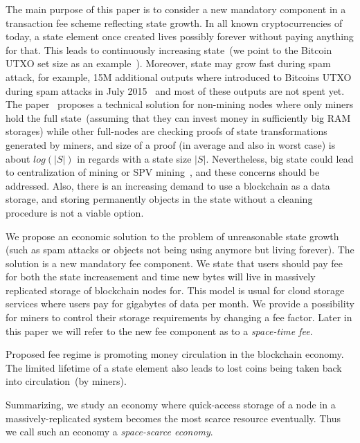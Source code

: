 \documentclass[]{llncs}   %
\begin{document}
The main purpose of this paper is to consider a new mandatory component in a transaction fee scheme reflecting state growth. In all known cryptocurrencies of today, a state element once created lives possibly forever without paying anything for that. This leads to continuously increasing state~(we point to the Bitcoin UTXO set size as an example~\cite{utxoChart}). Moreover, state may grow fast during spam attack, for example, 15M additional outputs where introduced to Bitcoins UTXO during spam attacks in July 2015~\cite{bitcoin2015flood} and most of these outputs are not spent yet. The paper~\cite{reyzin2016improving} proposes a technical solution for non-mining nodes where only miners hold the full state~(assuming that they can invest money in sufficiently big RAM storages) while other full-nodes are checking proofs of state transformations generated by miners, and size of a proof (in average and also in worst case) is about $log(|S|)$ in regards with a state size $|S|$. Nevertheless, big state could lead to centralization of mining or SPV mining~\cite{spvMining}, and these concerns should be addressed. Also, there is an increasing demand to use a blockchain as a data storage, and storing permanently objects in the state without a cleaning procedure is not a viable option.

We propose an economic solution to the problem of unreasonable state growth (such as spam attacks or objects not being using anymore but living forever). The solution is a new mandatory fee component. We state that users should pay fee for both the state increasement and time new bytes will live in massively replicated storage of blockchain nodes for. This model is usual for cloud storage services where users pay for gigabytes of data per month. We provide a possibility for miners to control their storage requirements by changing a fee factor. Later in this paper we will refer to the new fee component as to a \textit{space-time fee}.

Proposed fee regime is promoting money circulation in the blockchain economy. The limited lifetime of a state element also leads to lost coins being taken back into circulation~(by miners). 

Summarizing, we study an economy where quick-access storage of a node in a massively-replicated system becomes the most scarce resource eventually. Thus we call such an economy a \textit{space-scarce economy}.
\end{document}
